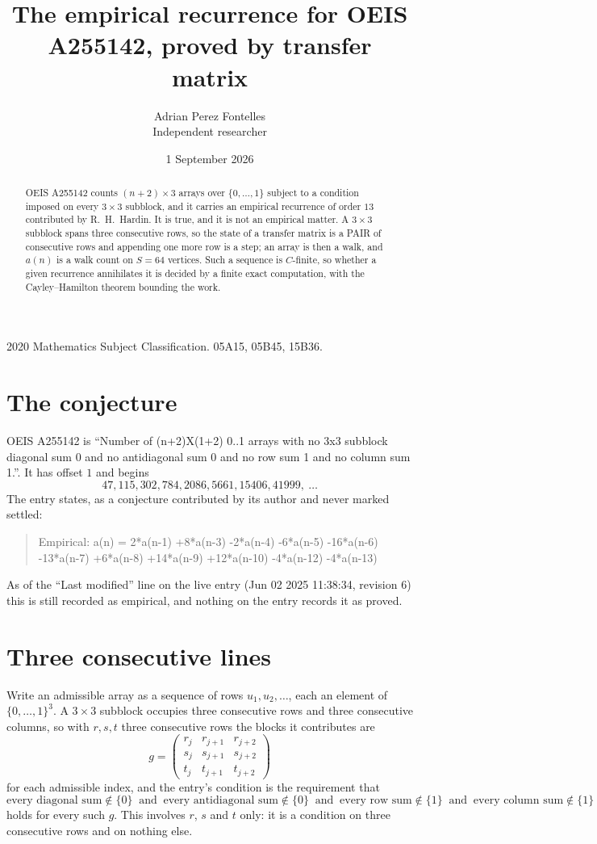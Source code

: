 \documentclass[11pt,a4paper]{article}
\title{The empirical recurrence for OEIS A255142, proved by transfer matrix}
\author{Adrian Perez Fontelles\\ \small Independent researcher}
\date{1 September 2026}
\theoremstyle{plain}
\theoremstyle{definition}
\begin{document}
\maketitle

\begin{abstract}
OEIS A255142 counts $(n+2)\times3$ arrays over $\{0,\dots,1\}$ subject to a condition imposed on
every $3\times3$ subblock, and it carries an empirical recurrence of order $13$
contributed by R.~H.~Hardin. It is true, and it is not an empirical matter. A $3\times3$
subblock spans three consecutive rows, so the state of a transfer matrix is a PAIR of
consecutive rows and appending one more row is a step; an array is then a walk, and
$a(n)$ is a walk count on $S=64$ vertices. Such a sequence is $C$-finite, so whether a given
recurrence annihilates it is decided by a finite exact computation, with the Cayley--Hamilton
theorem bounding the work.
\end{abstract}

\noindent\small 2020 Mathematics Subject Classification. 05A15, 05B45, 15B36.\normalsize

\section{The conjecture}

OEIS A255142 is ``Number of (n+2)X(1+2) 0..1 arrays with no 3x3 subblock diagonal sum 0 and no antidiagonal sum 0 and no row sum 1 and no column sum 1.''. It has offset $1$ and begins
\[
47, 115, 302, 784, 2086, 5661, 15406, 41999,\ \dots
\]
The entry states, as a conjecture contributed by its author and never marked settled:
\begin{quote}
Empirical: a(n) = 2*a(n-1) +8*a(n-3) -2*a(n-4) -6*a(n-5) -16*a(n-6) -13*a(n-7) +6*a(n-8) +14*a(n-9) +12*a(n-10) -4*a(n-12) -4*a(n-13)
\end{quote}
As of the ``Last modified'' line on the live entry (Jun 02 2025 11:38:34, revision 6) this is still
recorded as empirical, and nothing on the entry records it as proved.

\section{Three consecutive lines}

Write an admissible array as a sequence of rows $u_1,u_2,\dots$, each an element of
$\{0,\dots,1\}^{3}$. A $3\times3$ subblock occupies three consecutive rows and
three consecutive columns, so with $r,s,t$ three consecutive rows the blocks it
contributes are
\[
g=\begin{pmatrix}r_j&r_{j+1}&r_{j+2}\\ s_j&s_{j+1}&s_{j+2}\\ t_j&t_{j+1}&t_{j+2}\end{pmatrix}
\]
for each admissible index, and the entry's condition is the requirement that
\[
\text{every diagonal sum} \notin \{0\}\ \text{ and }\ \text{every antidiagonal sum} \notin \{0\}\ \text{ and }\ \text{every row sum} \notin \{1\}\ \text{ and }\ \text{every column sum} \notin \{1\}
\]
holds for every such $g$. This involves $r$, $s$ and $t$ only: it is a condition on
three consecutive rows and on nothing else.
\end{document}
